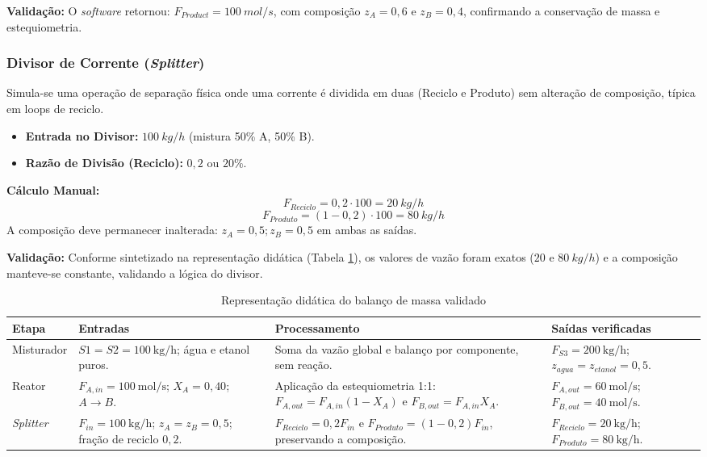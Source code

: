 \textbf{Validação:}
O \textit{software} retornou: $F_{Product} = 100 \ mol/s$, com composição $z_A=0,6$ e $z_B=0,4$, confirmando a conservação de massa e estequiometria.

\subsubsection{Divisor de Corrente (\textit{Splitter})}

Simula-se uma operação de separação física onde uma corrente é dividida em duas (Reciclo e Produto) sem alteração de composição, típica em loops de reciclo.

\begin{itemize}
    \item \textbf{Entrada no Divisor:} $100 \ kg/h$ (mistura 50\% A, 50\% B).
    \item \textbf{Razão de Divisão (Reciclo):} $0,2$ ou $20\%$.
\end{itemize}

\textbf{Cálculo Manual:}
\begin{equation}
    \label{eq:val_recycle_flow_mass}
    F_{Reciclo} = 0,2 \cdot 100 = 20 \ kg/h
\end{equation}
\begin{equation}
    \label{eq:val_product_flow_mass}
    F_{Produto} = (1 - 0,2) \cdot 100 = 80 \ kg/h
\end{equation}
A composição deve permanecer inalterada: $z_A=0,5; z_B=0,5$ em ambas as saídas.

\textbf{Validação:}
Conforme sintetizado na representação didática (Tabela \ref{fig:code_mass_balance_exp}), os valores de vazão foram exatos ($20$ e $80 \ kg/h$) e a composição manteve-se constante, validando a lógica do divisor.

\begin{table}[H]
    \centering
    \caption{Representação didática do balanço de massa validado}
    \label{fig:code_mass_balance_exp}
    \footnotesize
    \begin{tabular}{@{}p{}p{}p{}p{}@{}}
        \hline
        \textbf{Etapa} & \textbf{Entradas} & \textbf{Processamento} & \textbf{Saídas verificadas} \\
        \hline
        Misturador & $S1=S2=100\ \mathrm{kg/h}$; água e etanol puros. & Soma da vazão global e balanço por componente, sem reação. & $F_{S3}=200\ \mathrm{kg/h}$; $z_{agua}=z_{etanol}=0,5$. \\
        Reator & $F_{A,in}=100\ \mathrm{mol/s}$; $X_A=0,40$; $A\to B$. & Aplicação da estequiometria 1:1: $F_{A,out}=F_{A,in}(1-X_A)$ e $F_{B,out}=F_{A,in}X_A$. & $F_{A,out}=60\ \mathrm{mol/s}$; $F_{B,out}=40\ \mathrm{mol/s}$. \\
        \textit{Splitter} & $F_{in}=100\ \mathrm{kg/h}$; $z_A=z_B=0,5$; fração de reciclo $0,2$. & $F_{Reciclo}=0,2F_{in}$ e $F_{Produto}=(1-0,2)F_{in}$, preservando a composição. & $F_{Reciclo}=20\ \mathrm{kg/h}$; $F_{Produto}=80\ \mathrm{kg/h}$. \\
        \hline
    \end{tabular}
\end{table}

